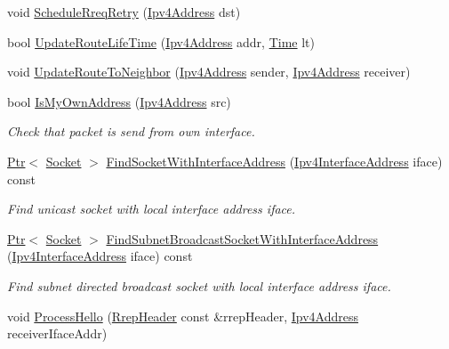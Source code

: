 \begin{DoxyCompactItemize}
void \hyperlink{classns3_1_1aodv_1_1RoutingProtocol_a85e17b36131d0582099347a4379bef11}{Schedule\+Rreq\+Retry} (\hyperlink{classns3_1_1Ipv4Address}{Ipv4\+Address} dst)
\item 
bool \hyperlink{classns3_1_1aodv_1_1RoutingProtocol_a204c68e4ce5aa8dc799f9fd039f8cbc7}{Update\+Route\+Life\+Time} (\hyperlink{classns3_1_1Ipv4Address}{Ipv4\+Address} addr, \hyperlink{classns3_1_1Time}{Time} lt)
\item 
void \hyperlink{classns3_1_1aodv_1_1RoutingProtocol_a0df782358a389aadd46ceffab9535cef}{Update\+Route\+To\+Neighbor} (\hyperlink{classns3_1_1Ipv4Address}{Ipv4\+Address} sender, \hyperlink{classns3_1_1Ipv4Address}{Ipv4\+Address} receiver)
\item 
bool \hyperlink{classns3_1_1aodv_1_1RoutingProtocol_a822621de276958cf1d22fb3be536bb49}{Is\+My\+Own\+Address} (\hyperlink{classns3_1_1Ipv4Address}{Ipv4\+Address} src)
\begin{DoxyCompactList}\small\item\em Check that packet is send from own interface. \end{DoxyCompactList}\item 
\hyperlink{classns3_1_1Ptr}{Ptr}$<$ \hyperlink{classns3_1_1Socket}{Socket} $>$ \hyperlink{classns3_1_1aodv_1_1RoutingProtocol_a7cebc7baa398569f432ea2521310dffe}{Find\+Socket\+With\+Interface\+Address} (\hyperlink{classns3_1_1Ipv4InterfaceAddress}{Ipv4\+Interface\+Address} iface) const 
\begin{DoxyCompactList}\small\item\em Find unicast socket with local interface address iface. \end{DoxyCompactList}\item 
\hyperlink{classns3_1_1Ptr}{Ptr}$<$ \hyperlink{classns3_1_1Socket}{Socket} $>$ \hyperlink{classns3_1_1aodv_1_1RoutingProtocol_ac7263145b54db100e0adc56a06d94c6b}{Find\+Subnet\+Broadcast\+Socket\+With\+Interface\+Address} (\hyperlink{classns3_1_1Ipv4InterfaceAddress}{Ipv4\+Interface\+Address} iface) const 
\begin{DoxyCompactList}\small\item\em Find subnet directed broadcast socket with local interface address iface. \end{DoxyCompactList}\item 
void \hyperlink{classns3_1_1aodv_1_1RoutingProtocol_a5535371d9e72ee97a24be5b67eef982f}{Process\+Hello} (\hyperlink{classns3_1_1aodv_1_1RrepHeader}{Rrep\+Header} const \&rrep\+Header, \hyperlink{classns3_1_1Ipv4Address}{Ipv4\+Address} receiver\+Iface\+Addr)

\end{DoxyCompactItemize}
